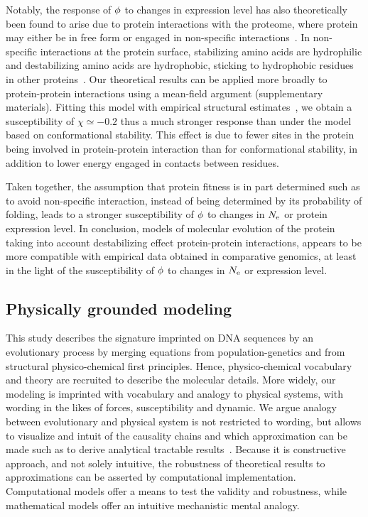 Notably, the response of $\phi$ to changes in expression level has also theoretically been found to arise due to protein interactions with the proteome, where protein may either be in free form or engaged in non-specific interactions~\citep{Yang2012, Zhang2013}.
In non-specific interactions at the protein surface, stabilizing amino acids are hydrophilic and destabilizing amino acids are hydrophobic, sticking to hydrophobic residues in other proteins~\citep{Dixit2013,Manhart2015}.
Our theoretical results can be applied more broadly to protein-protein interactions using a mean-field argument (supplementary materials).
Fitting this model with empirical structural estimates~\citep{Janin1995a, Zhang2008}, we obtain a susceptibility of $\chi \simeq -0.2$ thus a much stronger response than under the model based on conformational stability.
This effect is due to fewer sites in the protein being involved in protein-protein interaction than for conformational stability, in addition to lower energy engaged in contacts between residues.

Taken together, the assumption that protein fitness is in part determined such as to avoid non-specific interaction, instead of being determined by its probability of folding, leads to a stronger susceptibility of $\phi$ to changes in $N_{\mathrm{e}}$ or protein expression level.
In conclusion, models of molecular evolution of the protein taking into account destabilizing effect protein-protein interactions, appears to be more compatible with empirical data obtained in comparative genomics, at least in the light of the susceptibility of $\phi$ to changes in $N_{\mathrm{e}}$ or expression level.

\subsection{Physically grounded modeling}
This study describes the signature imprinted on \acrshort{DNA} sequences by an evolutionary process by merging equations from population-genetics and from structural physico-chemical first principles.
Hence, physico-chemical vocabulary and theory are recruited to describe the molecular details.
More widely, our modeling is imprinted with vocabulary and analogy to physical systems, with wording in the likes of forces, susceptibility and dynamic.
We argue analogy between evolutionary and physical system is not restricted to wording, but allows to visualize and intuit of the causality chains and which approximation can be made such as to derive analytical tractable results~\citep{Sella2005, Mustonen2009, Bastolla2012, Bastolla2017}.
Because it is constructive approach, and not solely intuitive, the robustness of theoretical results to approximations can be asserted by computational implementation.
Computational models offer a means to test the validity and robustness, while mathematical models offer an intuitive mechanistic mental analogy.

